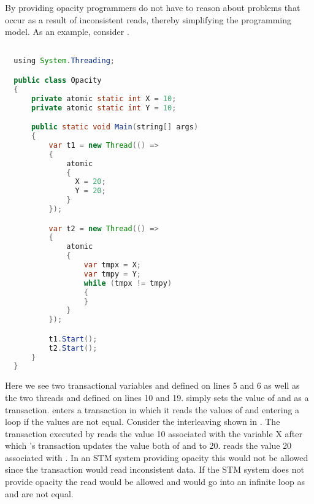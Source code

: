 By providing opacity programmers do not have to reason about problems that occur as a result of inconsistent reads\cite[p. 28]{harris2010transactional}, thereby simplifying the programming model. As an example, consider .

\begin{lstlisting}[label=lst:stm_opacity,
  caption={Opacity example},
  language=Java,  
  showspaces=false,
  showtabs=false,
  breaklines=true,
  showstringspaces=false,
  breakatwhitespace=true,
  commentstyle=\color{greencomments},
  keywordstyle=\color{bluekeywords},
  stringstyle=\color{redstrings},
  morekeywords={atomic, retry, orelse, var, get, set, using}]  % Start your code-block

  using System.Threading;

  public class Opacity
  {
      private atomic static int X = 10;
      private atomic static int Y = 10;

      public static void Main(string[] args)
      {
          var t1 = new Thread(() =>
          {
              atomic
              {
                X = 20;
                Y = 20;
              }
          });

          var t2 = new Thread(() =>
          {
              atomic
              {
                  var tmpx = X;
                  var tmpy = Y;
                  while (tmpx != tmpy)
                  {
                  }
              }
          });

          t1.Start();
          t2.Start();
      }
  }
\end{lstlisting}
Here we see two transactional variables  and  defined on lines 5 and 6 as well as the two threads  and  defined on lines 10 and 19.  simply sets the value of  and  as a transaction.  enters a transaction in which it reads the values of  and  entering a loop if the values are not equal. Consider the interleaving shown in . The transaction executed by  reads the value 10 associated with the variable X after which 's transaction updates the value both of  and  to 20.  reads the value 20 associated with . In an \ac{STM} system providing opacity this would not be allowed since the transaction would read inconsistent data. If the \ac{STM} system does not provide opacity the read would be allowed and  would go into an infinite loop as  and  are not equal. 

